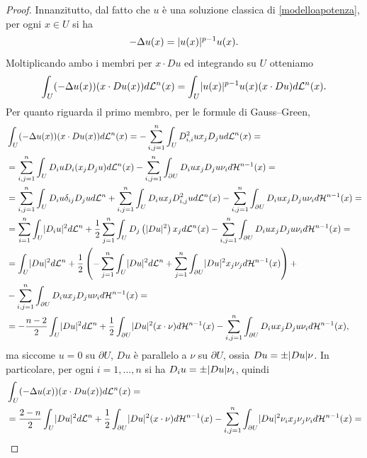 \begin{proof}
Innanzitutto, dal fatto che $u$ è una soluzione classica di \eqref{modelloapotenza}, per ogni $x \in U$ si ha
\[ 	-\Delta u(x) = \lvert u(x)\rvert^{p-1}u(x). \]
Moltiplicando ambo i membri per $x \cdot Du$ ed integrando su $U$ otteniamo 
\[ \int_U (-\Delta u(x))(x \cdot Du(x))d\mathcal{L}^n(x) = \int_U \lvert u(x)\rvert^{p-1}u(x) (x\cdot Du)d\mathcal{L}^n(x). \]
Per quanto riguarda il primo membro, per le formule di Gauss--Green, 
\begin{align*}
	&\int_U (-\Delta u(x))(x \cdot Du(x))d\mathcal{L}^n(x) = -\sum_{i,j=1}^{n}\int_U D^2_{i,i}u x_j D_ju d\mathcal{L}^n(x) = \\
	&= \sum_{i,j=1}^{n}\int_U D_iu D_i(x_j D_ju) d\mathcal{L}^n(x) - \sum_{i,j=1}^{n}\int_{\partial U} D_iu x_j D_ju \nu_i d\mathcal{H}^{n-1}(x)= \\
	&= \sum_{i,j=1}^{n} \int_U D_i u \delta_{ij} D_ju d\mathcal{L}^n + \sum_{i,j=1}^{n} \int_U D_iu x_j D^2_{i,j}u d\mathcal{L}^n(x) - \sum_{i,j=1}^{n}\int_{\partial U} D_iu x_j D_ju \nu_i d\mathcal{H}^{n-1}(x)= \\
	&= \sum_{i=1}^{n}\int_{U} \lvert D_iu\rvert^2 d\mathcal{L}^{n} + \frac{1}{2}\sum_{j=1}^{n}\int_U D_j\left( \lvert Du\rvert^2\right)  x_j d\mathcal{L}^n(x) - \sum_{i,j=1}^{n}\int_{\partial U} D_iu x_j D_ju \nu_i d\mathcal{H}^{n-1}(x)=\\
	&= \int_{U} \lvert Du\rvert^2 d\mathcal{L}^{n} + \frac{1}{2}\left( -\sum_{j=1}^{n} \int_U \lvert Du\rvert^2 d\mathcal{L}^n + \sum_{j=1}^{n}\int_{\partial U} \lvert Du\rvert^2 x_j\nu_j d\mathcal{H}^{n-1}(x)\right) + \\
	&- \sum_{i,j=1}^{n}\int_{\partial U} D_iu x_j D_ju \nu_i d\mathcal{H}^{n-1}(x) = \\
	&= -\frac{n-2}{2} \int_U \lvert Du\rvert^2 d\mathcal{L}^n + \frac{1}{2}\int_{\partial U} \lvert Du\rvert^2 (x \cdot \nu)d\mathcal{H}^{n-1}(x) -  \sum_{i,j=1}^{n}\int_{\partial U} D_iu x_j D_ju \nu_i d\mathcal{H}^{n-1}(x),
\end{align*}
ma siccome $u = 0$ su $\partial U$, $Du$ è parallelo a $\nu$ su $\partial U$, ossia $Du = \pm \lvert Du\rvert\nu$. In particolare, per ogni $i=1,\dots,n$ si ha $D_iu = \pm \lvert Du\rvert\nu_i$, quindi 
\begin{align*}
	&\int_U (-\Delta u(x))(x \cdot Du(x))d\mathcal{L}^n(x) = \\
	&=\frac{2-n}{2} \int_U \abs{Du}^2 d\mathcal{L}^n + \frac{1}{2}\int_{\partial U} \abs{Du}^2 (x \cdot \nu)d\mathcal{H}^{n-1}(x) - \sum_{i,j=1}^{n}\int_{\partial U} \abs{Du}^2\nu_i x_j\nu_j \nu_i d\mathcal{H}^{n-1}(x) = \\

\end{align*}
\end{proof}
